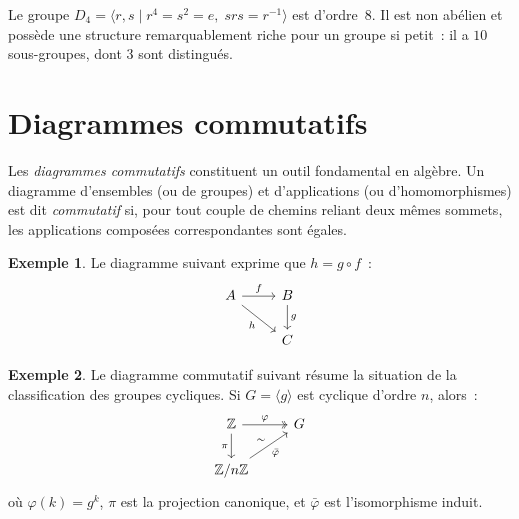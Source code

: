 \documentclass[12pt,a4paper,openany]{book}
\theoremstyle{definition}
\newtheorem{exemple}{Exemple}[chapter]
\newcommand{\Z}{\mathbb{Z}}
\newcommand{\abs}[1]{\lvert #1 \rvert}
\newcommand{\gen}[1]{\langle #1 \rangle}
\begin{document}
\begin{center}
\end{center}

Le groupe $D_4 = \gen{r, s \mid r^4 = s^2 = e,\; srs = r^{-1}}$ est d'ordre~$8$. Il
est non abélien et possède une structure remarquablement riche pour un groupe si petit~:
il a $10$ sous-groupes, dont $3$ sont distingués.

\section{Diagrammes commutatifs}
\label{sec:ch1-diagrammes}

Les \emph{diagrammes commutatifs} constituent un outil
fondamental en algèbre. Un diagramme d'ensembles (ou de groupes) et d'applications (ou
d'homomorphismes) est dit \emph{commutatif} si, pour tout couple de chemins reliant deux
mêmes sommets, les applications composées correspondantes sont égales.

\begin{exemple}
Le diagramme suivant exprime que $h = g \circ f$~:
\[
\begin{tikzcd}
  A \arrow[r, "f"] \arrow[dr, "h"'] & B \arrow[d, "g"] \\
  & C
\end{tikzcd}
\]
\end{exemple}

\begin{exemple}
Le diagramme commutatif suivant résume la situation de la classification des groupes
cycliques. Si $G = \gen{g}$ est cyclique d'ordre $n$, alors~:
\[
\begin{tikzcd}
  \Z \arrow[r, "\varphi", two heads] \arrow[d, "\pi"'] & G \\
  \Z/n\Z \arrow[ur, "\bar{\varphi}"', "\sim"]
\end{tikzcd}
\]
où $\varphi(k) = g^k$, $\pi$ est la projection canonique, et $\bar{\varphi}$ est
l'isomorphisme induit.
\end{exemple}
\end{document}

